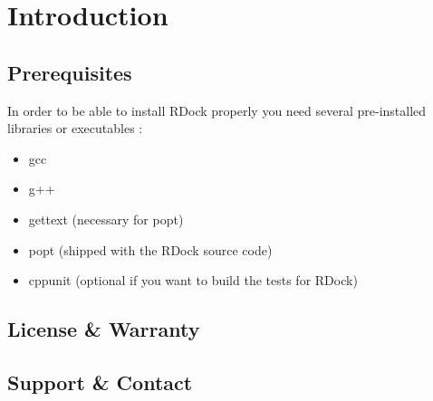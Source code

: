 \clearpage 
\section{Introduction}  \label{Introduction}
	\subsection{Prerequisites}  \label{Prerequisites}
	In order to be able to install RDock properly you need several pre-installed libraries or executables : 
	\begin{itemize}
		\item gcc
		\item g++
		\item gettext (necessary for popt)
		\item popt (shipped with the RDock source code)
		\item cppunit (optional if you want to build the tests for RDock)
	\end{itemize}
	
	\subsection{License \& Warranty}
	
	\subsection{Support \& Contact}
